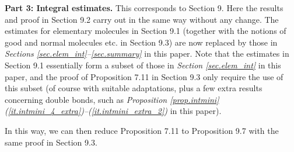 \documentclass[10pt, reqno]{amsart}
\theoremstyle{definition}
\theoremstyle{remark}
\numberwithin{equation}{section}
\begin{document}
\medskip
\textbf{Part 3: Integral estimates.} This corresponds to Section 9. Here the results and proof in Section 9.2 carry out in the same way without any change. The estimates for elementary molecules in Section 9.1 (together with the notions of good and normal molecules etc. in Section 9.3) are now replaced by those in \emph{Sections \ref{sec.elem_int}--\ref{sec.summary}} in this paper. Note that the estimates in Section 9.1 essentially form a subset of those in \emph{Section \ref{sec.elem_int}} in this paper, and the proof of Proposition 7.11 in Section 9.3 only require the use of this subset (of course with suitable adaptations, plus a few extra results concerning double bonds, such as \emph{Proposition \ref{prop.intmini} (\ref{it.intmini_4_extra})--(\ref{it.intmini_extra_2})} in this paper).

In this way, we can then reduce Proposition 7.11 to Proposition 9.7 with the same proof in Section 9.3.
\end{document}
